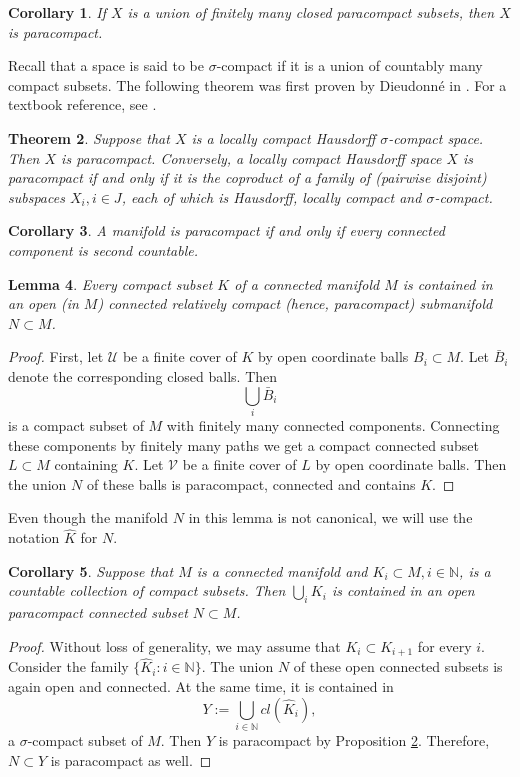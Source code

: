 \documentclass[11pt]{article}   	%
\newtheorem{thm}{Theorem}
\newtheorem{lem}[thm]{Lemma}
\newtheorem{cor}[thm]{Corollary}
\def\N{\mathbb N}
\def\cU{\mathcal U}
\def\cV{\mathcal V}
\begin{document}
\begin{cor}\label{cor:CA1}
If $X$ is a union of finitely many closed paracompact subsets, then $X$ is paracompact. 
\end{cor}



Recall that a space is said to be $\sigma$-compact if it is a union of countably many compact subsets. The following theorem was first proven by  
Dieudonn\'e in \cite{D}. For a textbook reference, see \cite[Ch. I.10, Theorem 5]{Bourbaki}. 


\begin{thm}\label{prop:PA1}
Suppose that $X$ is a locally compact Hausdorff $\sigma$-compact space. Then $X$ is paracompact. 
Conversely, a locally compact Hausdorff space $X$ is paracompact if and only if it is the coproduct of a family of (pairwise disjoint) subspaces $X_i, i\in J$, 
each of which is Hausdorff, locally compact and $\sigma$-compact. 
\end{thm}

\begin{cor}
A manifold is paracompact if and only if every connected component is second countable. 
\end{cor}

\begin{lem}\label{lem:L1}
Every compact subset $K$ of a connected manifold $M$ is contained in an open (in $M$) connected relatively compact (hence, paracompact) submanifold $N\subset M$.
\end{lem}
\begin{proof} First, let $\cU$ be a finite cover of $K$ by open coordinate balls $B_i\subset M$. Let $\bar{B}_i$ denote the corresponding closed balls. Then 
$$
\bigcup_{i} \bar{B}_i
$$
is a compact subset of $M$ with finitely many connected components. Connecting these components by finitely many paths we get a compact connected 
subset $L\subset M$ containing $K$. Let $\cV$ be a finite cover of $L$ by open coordinate balls. Then the union $N$ of these balls is paracompact, 
connected and contains $K$. \end{proof} 

\medskip
Even though the manifold $N$ in this lemma is not canonical, we will use the notation $\hat K$ for $N$. 



\begin{cor}\label{cor:CA2}
Suppose that $M$ is a connected manifold and $K_i\subset M, i\in \mathbb N$, is a countable collection of compact subsets. Then $\bigcup_i K_i$ is contained 
in an open paracompact connected subset $N\subset M$. 
\end{cor}
\begin{proof} Without loss of generality, we may assume that $K_i\subset K_{i+1}$ for every $i$. Consider the family $\{\hat K_i: i\in \mathbb N\}$. The union $N$ of these 
open connected subsets is again open and connected. At the same time, it is contained in 
$$
Y:=\bigcup_{i\in \N} cl(\hat K_i),
$$ 
a $\sigma$-compact subset of $M$. Then $Y$ is paracompact by Proposition \ref{prop:PA1}. Therefore,  $N\subset Y$ is paracompact as well. 
\end{proof}
\end{document}
